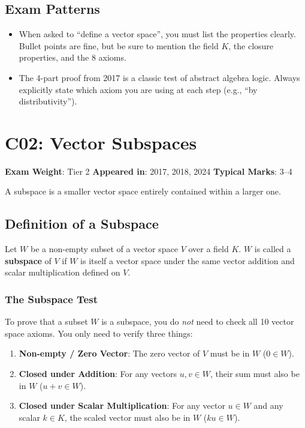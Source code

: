 \documentclass[
]{article}
\providecommand{\tightlist}{%
  \setlength{\itemsep}{0pt}\setlength{\parskip}{0pt}}
\renewenvironment{quote}
  {\begin{tcolorbox}[
     colback=calloutbg,
     colframe=calloutframe,
     colupper=callouttext,
     arc=3pt,
     boxrule=0.5pt,
     leftrule=0.5pt,
     borderline west={3pt}{0pt}{calloutaccent},
     left=8pt,
     right=8pt,
     top=6pt,
     bottom=6pt
   ]}
  {\end{tcolorbox}}
\begin{document}
\subsection{Exam Patterns}\label{exam-patterns-29}

\begin{itemize}
\tightlist
\item
  When asked to ``define a vector space'', you must list the properties
  clearly. Bullet points are fine, but be sure to mention the field
  \(K\), the closure properties, and the 8 axioms.
\item
  The 4-part proof from 2017 is a classic test of abstract algebra
  logic. Always explicitly state which axiom you are using at each step
  (e.g., ``by distributivity'').
\end{itemize}

\section{C02: Vector Subspaces}\label{c02-vector-subspaces}

\begin{quote}
\textbf{Exam Weight}: Tier 2 \textbar{} \textbf{Appeared in}: 2017,
2018, 2024 \textbar{} \textbf{Typical Marks}: 3--4
\end{quote}

A subspace is a smaller vector space entirely contained within a larger
one.

\subsection{Definition of a Subspace}\label{definition-of-a-subspace}

Let \(W\) be a non-empty subset of a vector space \(V\) over a field
\(K\). \(W\) is called a \textbf{subspace} of \(V\) if \(W\) is itself a
vector space under the same vector addition and scalar multiplication
defined on \(V\).

\subsubsection{The Subspace Test}\label{the-subspace-test}

To prove that a subset \(W\) is a subspace, you do \emph{not} need to
check all 10 vector space axioms. You only need to verify three things:

\begin{enumerate}
\def\labelenumi{\arabic{enumi}.}
\tightlist
\item
  \textbf{Non-empty / Zero Vector}: The zero vector of \(V\) must be in
  \(W\) (\(0 \in W\)).
\item
  \textbf{Closed under Addition}: For any vectors \(u, v \in W\), their
  sum must also be in \(W\) (\(u + v \in W\)).
\item
  \textbf{Closed under Scalar Multiplication}: For any vector
  \(u \in W\) and any scalar \(k \in K\), the scaled vector must also be
  in \(W\) (\(ku \in W\)).
\end{enumerate}
\end{document}
